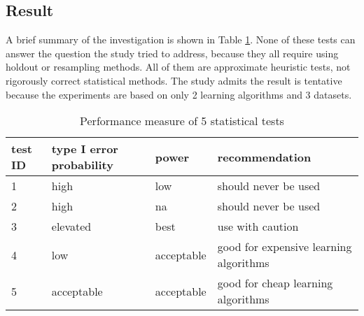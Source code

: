 \documentclass[12pt]{article}
\begin{document}
\subsection{Result}
A brief summary of the investigation is shown in Table \ref{tab:result}. None of these tests can answer the question the study tried to address, because they all require using holdout or resampling methods. All of them are approximate heuristic tests, not rigorously correct statistical methods. The study admits the result is tentative because the experiments are based on only 2 learning algorithms and 3 datasets.
\begin{table}[htb]
  \centering
  \begin{tabularx}{\textwidth}{|l|l|l|X|} \hline
    test ID & type I error probability & power & recommendation \\ \hline
    1 & high & low & should never be used  \\ \hline
    2 & high & na & should never be used \\ \hline
    3 & elevated & best & use with caution \\ \hline
    4 & low & acceptable & good for expensive learning algorithms \\ \hline
    5 & acceptable & acceptable & good for cheap learning algorithms \\ \hline
  \end{tabularx}
  \caption{Performance measure of 5 statistical tests}
  \label{tab:result}
\end{table}
\end{document}
